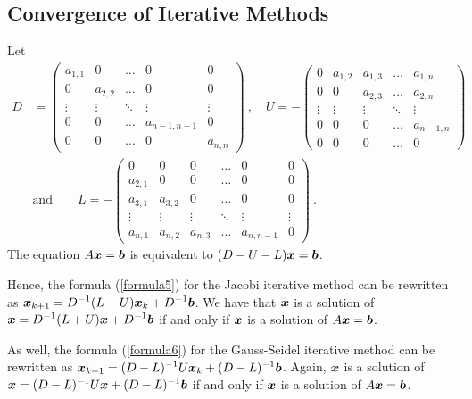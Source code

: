 \subsection{Convergence of Iterative Methods}
\label{conv_JGSIM}

Let
\begin{equation}\label{ADUL}
\begin{split}
D &= \begin{pmatrix}
a_{1,1} & 0 & \ldots & 0 & 0 \\
 0 & a_{2,2} & \ldots & 0 & 0 \\
\vdots & \vdots & \ddots & \vdots & \vdots \\
0 & 0 & \ldots & a_{n-1,n-1} & 0 \\
0 & 0 & \ldots & 0 & a_{n,n}
\end{pmatrix} \ , \quad
U = -\begin{pmatrix}
0 & a_{1,2} & a_{1,3} & \ldots  & a_{1,n} \\
0 & 0 & a_{2,3} & \ldots & a_{2,n} \\
\vdots & \vdots & \vdots & \ddots & \vdots \\
0 & 0 & 0 & \ldots & a_{n-1,n} \\
0 & 0 & 0 & \ldots & 0
\end{pmatrix} \\
&\text{and} \qquad L = -\begin{pmatrix}
0 & 0 & 0 &  \ldots & 0 & 0 \\
a_{2,1} & 0 & 0 & \ldots & 0 & 0 \\
a_{3,1} & a_{3,2} & 0 & \ldots & 0 & 0 \\
\vdots & \vdots & \vdots & \ddots & \vdots & \vdots \\
a_{n,1} & a_{n,2} & a_{n,3} & \ldots & a_{n,n-1} & 0
\end{pmatrix} \ .
\end{split}
\end{equation}
The equation $A\bm{x} = \bm{b}$ is equivalent to
$(D-U-L)\bm{x} = \bm{b}$.

Hence, the formula (\ref{formula5}) for the Jacobi iterative method
can be rewritten as
$\displaystyle \bm{x}_{k+1} = D^{-1}(L + U) \bm{x}_{k} + D^{-1}\bm{b}$.
We have that $\bm{x}$ is a solution of
$\displaystyle \bm{x} = D^{-1}(L + U) \bm{x} + D^{-1}\bm{b}$ if and only if
$\bm{x}$ is a solution of $A \bm{x} = \bm{b}$.

As well, the formula (\ref{formula6}) for the Gauss-Seidel iterative
method can be rewritten as
$\displaystyle \bm{x}_{k+1} = (D-L)^{-1} U \bm{x}_{k} + (D-L)^{-1}\bm{b}$.
Again, $\bm{x}$ is a solution of
$\displaystyle \bm{x} = (D-L)^{-1} U \bm{x} + (D-L)^{-1}\bm{b}$
if and only if $\bm{x}$ is a solution of $A \bm{x} = \bm{b}$.

